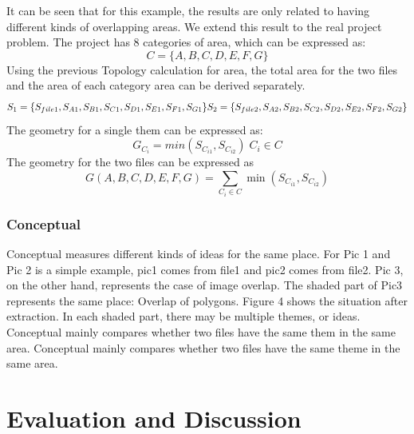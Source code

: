 It can be seen that for this example, the results are only related to having different kinds of overlapping areas. We extend this result to the real project problem. The project has 8 categories of area, which can be expressed as:
$$
C = \{A,B,C,D,E,F,G\}
$$
Using the previous Topology calculation for area, the total area for the two files and the area of each category area can be derived separately.
$$
S_1=\{S_{file1},S_{A1},S_{B1},S_{C1},S_{D1},S_{E1},S_{F1},S_{G1}\}\\
S_2=\{S_{file2},S_{A2},S_{B2},S_{C2},S_{D2},S_{E2},S_{F2},S_{G2}\}
$$
The geometry for a single them can be expressed as:
$$
G_{C_{i}}=min(S_{C_{i1}},S_{C_{i2}}) \;  C_i \in C 
$$
The geometry for the two files can be expressed as
$$
G(A,B,C,D,E,F,G) =  \sum\limits_{{C_i} \in C} {\min ({S_{{C_{i1}}}},{S_{{C_{i2}}}})} 
$$

\subsubsection*{Conceptual}
Conceptual measures different kinds of ideas for the same place. For Pic 1 and Pic 2 is a simple example, pic1 comes from file1 and pic2 comes from file2. Pic 3, on the other hand, represents the case of image overlap. The shaded part of Pic3 represents the same place: Overlap of polygons. Figure 4 shows the situation after extraction. In each shaded part, there may be multiple themes, or ideas. Conceptual mainly compares whether two files have the same them in the same area. Conceptual mainly compares whether two files have the same theme in the same area. 













\section*{Evaluation and Discussion}
